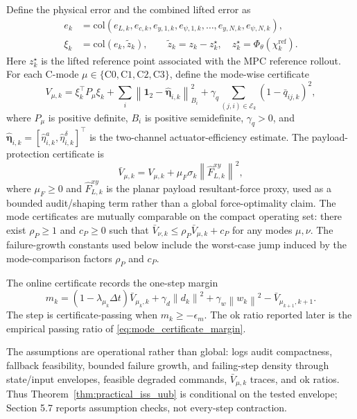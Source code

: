 \documentclass[letterpaper,journal]{IEEEtran}
\newcommand{\norm}[1]{\left\lVert #1 \right\rVert}
\begin{document}
Define the physical error and the combined lifted error as
\begin{equation}
\begin{aligned}
e_k&=\mathrm{col}\left(e_{L,k},e_{c,k},e_{y,1,k},e_{\psi,1,k},\ldots,e_{y,N,k},e_{\psi,N,k}\right),\\
\xi_k&=\mathrm{col}\left(e_k,\tilde z_k\right),
\qquad
\tilde z_k=z_k-z_k^\star,\quad
z_k^\star=\Phi_\theta(\chi_k^{\mathrm{ref}}).
\end{aligned}
\label{eq:xi_def}
\end{equation}
Here $z_k^\star$ is the lifted reference point associated with the MPC reference rollout. For each C-mode $\mu\in\{\mathrm{C0},\mathrm{C1},\mathrm{C2},\mathrm{C3}\}$, define the mode-wise certificate
\begin{equation}
V_{\mu,k}=\xi_k^\top P_\mu\xi_k+
\sum_i\norm{\mathbf 1_2-\hat{\boldsymbol\eta}_{i,k}}_{B_i}^2+
\gamma_q\sum_{(j,i)\in\mathcal E_k}(1-\bar q_{ij,k})^2 ,
\label{eq:lyapunov}
\end{equation}
where $P_\mu$ is positive definite, $B_i$ is positive semidefinite, $\gamma_q>0$, and
$\hat{\boldsymbol\eta}_{i,k}=[\hat\eta^a_{i,k},\hat\eta^\delta_{i,k}]^\top$ is the two-channel actuator-efficiency estimate. The payload-protection certificate is
\begin{equation}
\bar V_{\mu,k}=V_{\mu,k}+\mu_F\sigma_k\norm{\hat F_{L,k}^{xy}}^2 ,
\label{eq:augmented_lyapunov}
\end{equation}
where $\mu_F\ge0$ and $\hat F_{L,k}^{xy}$ is the planar payload resultant-force proxy, used as a bounded audit/shaping term rather than a global force-optimality claim. The mode certificates are mutually comparable on the compact operating set: there exist $\rho_P\ge1$ and $c_P\ge0$ such that
$\bar V_{\nu,k}\le \rho_P\bar V_{\mu,k}+c_P$ for any modes $\mu,\nu$.
The failure-growth constants used below include the worst-case jump induced by the mode-comparison factors $\rho_P$ and $c_P$.

The online certificate records the one-step margin
\begin{equation}
m_k=(1-\lambda_{\mu_k}\Delta t)\bar V_{\mu_k,k}
+\gamma_d\norm{d_k}^2+\gamma_w\norm{w_k}^2
-\bar V_{\mu_{k+1},k+1}.
\label{eq:mode_certificate_margin}
\end{equation}
The step is certificate-passing when $m_k\ge-\epsilon_m$. The ok ratio reported later is the empirical passing ratio of \eqref{eq:mode_certificate_margin}.

The assumptions are operational rather than global: logs audit compactness, fallback feasibility, bounded failure growth, and failing-step density through state/input envelopes, feasible degraded commands, $\bar V_{\mu,k}$ traces, and ok ratios. Thus Theorem~\ref{thm:practical_iss_uub} is conditional on the tested envelope; Section 5.7 reports assumption checks, not every-step contraction.
\end{document}
